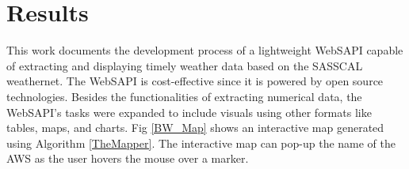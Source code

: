 \documentclass[a4paper, 10pt, conference]{ieeeconf}      %
\begin{document}
\section{\textbf{Results}}
 \label{Res}
\noindent
This work documents the development process of a  lightweight WebSAPI capable of extracting and  displaying  timely weather data based on the SASSCAL weathernet. The WebSAPI is cost-effective since it is powered by open source technologies. Besides  the  functionalities of extracting  numerical  data,   the WebSAPI's tasks were expanded
  to include visuals using other  formats like tables, maps, and charts. 
 Fig \ref{BW_Map} shows an interactive map generated using   Algorithm \ref{TheMapper}. The interactive map can pop-up the name of the AWS  as the user hovers the mouse over a marker.
\end{document}
